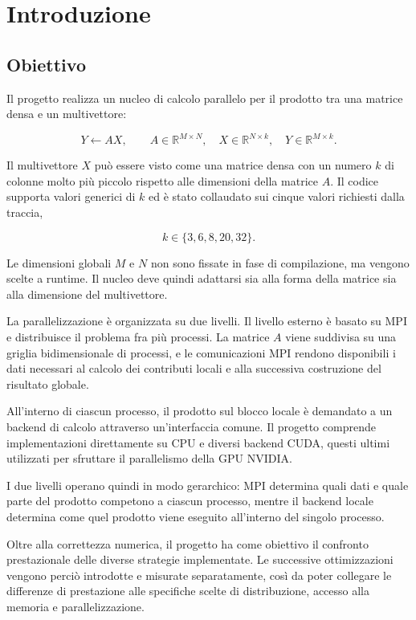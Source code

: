 \chapter{Introduzione}
\label{cap:introduzione}

\section{Obiettivo}

Il progetto realizza un nucleo di calcolo parallelo per il prodotto tra una
matrice densa e un multivettore:

\begin{equation}
    Y \leftarrow AX,
    \qquad
    A \in \mathbb{R}^{M\times N},
    \quad
    X \in \mathbb{R}^{N\times k},
    \quad
    Y \in \mathbb{R}^{M\times k}.
    \label{eq:problema}
\end{equation}

Il multivettore $X$ può essere visto come una matrice densa con un numero
$k$ di colonne molto più piccolo rispetto alle dimensioni della matrice
$A$. Il codice supporta valori generici di $k$ ed è stato collaudato sui
cinque valori richiesti dalla traccia,

\[
k \in \{3,6,8,20,32\}.
\]

Le dimensioni globali $M$ e $N$ non sono fissate in fase di compilazione,
ma vengono scelte a runtime. Il nucleo deve quindi adattarsi sia alla forma
della matrice sia alla dimensione del multivettore.

La parallelizzazione è organizzata su due livelli. Il livello esterno è
basato su MPI e distribuisce il problema fra più processi. La matrice $A$
viene suddivisa su una griglia bidimensionale di processi, e le
comunicazioni MPI rendono disponibili i dati necessari al calcolo dei
contributi locali e alla successiva costruzione del risultato globale.

All'interno di ciascun processo, il prodotto sul blocco locale è demandato
a un backend di calcolo attraverso un'interfaccia comune. Il progetto
comprende implementazioni direttamente su CPU e diversi backend CUDA, questi ultimi utilizzati
per sfruttare il parallelismo della GPU NVIDIA.

I due livelli operano quindi in modo gerarchico: MPI determina quali dati
e quale parte del prodotto competono a ciascun processo, mentre il backend
locale determina come quel prodotto viene eseguito all'interno del singolo
processo.

Oltre alla correttezza numerica, il progetto ha come obiettivo il confronto
prestazionale delle diverse strategie implementate. Le successive
ottimizzazioni vengono perciò introdotte e misurate separatamente, così da
poter collegare le differenze di prestazione alle specifiche scelte di
distribuzione, accesso alla memoria e parallelizzazione.

